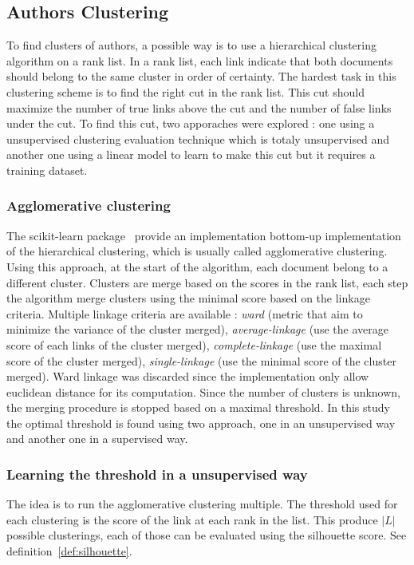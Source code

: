 \subsection{Authors Clustering}

To find clusters of authors, a possible way is to use a hierarchical clustering algorithm on a rank list.
In a rank list, each link indicate that both documents should belong to the same cluster in order of certainty.
The hardest task in this clustering scheme is to find the right cut in the rank list.
This cut should maximize the number of true links above the cut and the number of false links under the cut.
To find this cut, two apporaches were explored : one using a unsupervised clustering evaluation technique which is totaly unsupervised and another one using a linear model to learn to make this cut but it requires a training dataset.

\subsubsection{Agglomerative clustering}

The scikit-learn package~\cite{sklearn} provide an implementation bottom-up implementation of the hierarchical clustering, which is usually called agglomerative clustering.
Using this approach, at the start of the algorithm, each document belong to a different cluster.
Clusters are merge based on the scores in the rank list, each step the algorithm merge clusters using the minimal score based on the linkage criteria.
Multiple linkage criteria are available : \textit{ward} (metric that aim to minimize the variance of the cluster merged), \textit{average-linkage} (use the average score of each links of the cluster merged), \textit{complete-linkage} (use the maximal score of the cluster merged), \textit{single-linkage} (use the minimal score of the cluster merged).
Ward linkage was discarded since the implementation only allow euclidean distance for its computation.
Since the number of clusters is unknown, the merging procedure is stopped based on a maximal threshold.
In this study the optimal threshold is found using two approach, one in an unsupervised way and another one in a supervised way.

\subsubsection{Learning the threshold in a unsupervised way}

The idea is to run the agglomerative clustering multiple.
The threshold used for each clustering is the score of the link at each rank in the list.
This produce $|L|$ possible clusterings, each of those can be evaluated using the silhouette score.
See definition~\ref{def:silhouette}.

